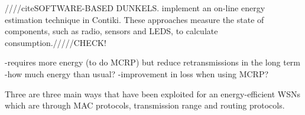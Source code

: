 

////citeSOFTWARE-BASED DUNKELS. implement an on-line energy estimation technique in Contiki. These approaches measure the state of components, such as radio, sensors and LEDS, to calculate consumption./////CHECK!

-requires more energy (to do MCRP) but reduce retransmissions in the long term
-how much energy than usual?
-improvement in loss when using MCRP?

Three are three main ways that have been exploited for an energy-efficient WSNs which are through MAC protocols, transmission range and routing protocols.


